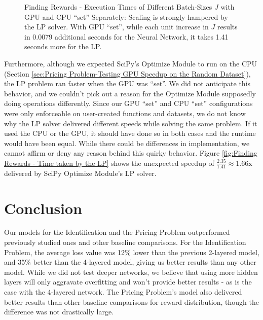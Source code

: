 \documentclass[12pt]{article}
\begin{document}
\begin{figure}[!htbp]
\begin{subfigure}{.49\textwidth}
            \label{fig:Finding Rewards - Time taken by the Neural Network}
        \end{subfigure}
        \vspace*{1em}
        \caption[Finding Rewards - Execution Times of Different Batch-Sizes $J$ with GPU and CPU ``set'' Separately]{Finding Rewards - Execution Times of Different Batch-Sizes $J$ with GPU and CPU ``set'' Separately: Scaling is strongly hampered by the LP solver. With GPU ``set'', while each unit increase in $J$ results in 0.0079 additional seconds for the Neural Network, it takes 1.41 seconds more for the LP.}
        \label{fig:Finding Rewards - Execution Times of Different Batch-Sizes J with GPU and CPU ``set'' Separately}
    \end{figure}

    Furthermore, although we expected SciPy's Optimize Module \cite{SCPOptimizeDocs} to run on the CPU (Section \ref{sec:Pricing Problem-Testing GPU Speedup on the Random Dataset}), the LP problem ran faster when the GPU was ``set''. We did not anticipate this behavior, and we couldn't pick out a reason for the Optimize Module supposedly doing operations differently. Since our GPU ``set'' and CPU ``set'' configurations were only enforceable on user-created functions and datasets, we do not know why the LP solver delivered different speeds while solving the same problem. If it used the CPU or the GPU, it should have done so in both cases and the runtime would have been equal. While there could be differences in implementation, we cannot affirm or deny any reason behind this quirky behavior. Figure \ref{fig:Finding Rewards - Time taken by the LP} shows the unexpected speedup of $\frac{2.35}{1.41} \approx 1.66$x delivered by SciPy Optimize Module's LP solver.
    
    \section{Conclusion} \label{sec:Conclusion}
    Our models for the Identification and the Pricing Problem outperformed previously studied ones and other baseline comparisons. For the Identification Problem, the average loss value was 12\% lower than the previous 2-layered model, and 35\% better than the 4-layered model, giving us better results than any other model. While we did not test deeper networks, we believe that using more hidden layers will only aggravate overfitting and won't provide better results - as is the case with the 4-layered network. The Pricing Problem's model also delivered better results than other baseline comparisons for reward distribution, though the difference was not drastically large.
    
\end{document}
